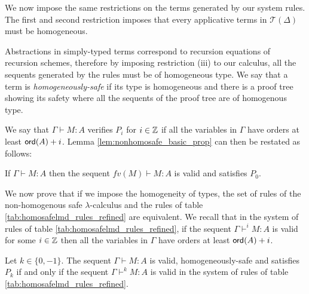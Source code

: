 We now impose the same restrictions on the terms generated by our system rules.
The first and second restriction imposes that every applicative terms in $\mathcal{T}(\Delta)$ must be homogeneous.

Abstractions in simply-typed terms correspond to recursion equations of recursion schemes,
therefore by imposing restriction (iii) to our calculus, all the sequents generated by the rules must be of homogeneous type.
We say that a term is \emph{homogeneously-safe} if its type is homogeneous
and there is a proof tree showing its safety where all the sequents
of the proof tree are of homogenous type.

We say that $\Gamma \vdash M : A$ verifies $P_i$ for $i \in \mathbb{Z}$ if all the
variables in $\Gamma$ have orders at least ${\sf ord}(A)+i$.
Lemma \ref{lem:nonhomosafe_basic_prop} can then be restated as follows:

\begin{lem}
\label{lem:context_reduction} If $\Gamma \vdash M : A$ then the sequent $fv(M) \vdash M : A$ is valid and satisfies $P_0$.
\end{lem}


We now prove that if we impose the homogeneity of types, the set of rules of the non-homogenous safe $\lambda$-calculus
and the rules of table \ref{tab:homosafelmd_rules_refined} are equivalent.  We recall that in the system of rules of
table \ref{tab:homosafelmd_rules_refined}, if the sequent $\Gamma \vdash^{i} M : A$ is valid for some $i \in
\mathbb{Z}$ then all the variables in $\Gamma$ have orders at least ${\sf ord}(A)+i$.

\begin{prop}
\label{prop:nonhomogsafe_homog_restriction}
Let $k \in \{ 0, -1 \}$. The sequent $\Gamma \vdash M : A$ is valid, homogeneously-safe and satisfies $P_k$
if and only if the sequent $\Gamma \vdash^k M : A$ is valid in the system of rules of table \ref{tab:homosafelmd_rules_refined}.
\end{prop}

